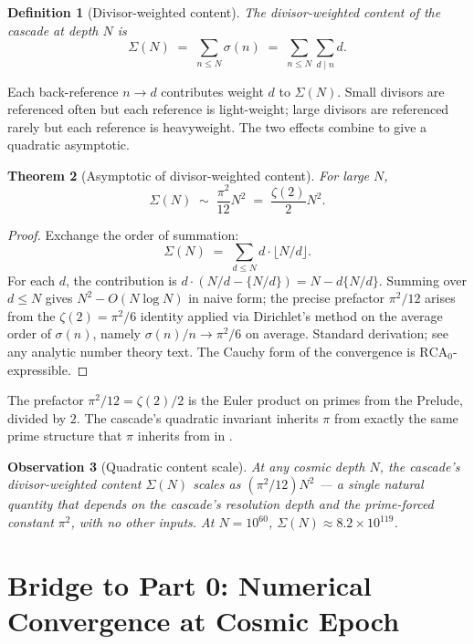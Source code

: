 \documentclass[11pt,a4paper]{article}
\newtheorem{theorem}{Theorem}[section]
\newtheorem{definition}[theorem]{Definition}
\newtheorem{observation}[theorem]{Observation}
\begin{document}
\begin{definition}[Divisor-weighted content]\label{def:divisor-weighted}
The divisor-weighted content of the cascade at depth $N$ is
\[
\Sigma(N) \;=\; \sum_{n \leq N} \sigma(n) \;=\; \sum_{n \leq N} \sum_{d \mid n} d.
\]
\end{definition}

\noindent Each back-reference $n \to d$ contributes weight $d$ to
$\Sigma(N)$. Small divisors are referenced often but each reference
is light-weight; large divisors are referenced rarely but each
reference is heavyweight. The two effects combine to give a
quadratic asymptotic.

\begin{theorem}[Asymptotic of divisor-weighted content]\label{thm:sigma-asymptotic}
For large $N$,
\[
\Sigma(N) \;\sim\; \frac{\pi^2}{12} N^2 \;=\; \frac{\zeta(2)}{2} N^2.
\]
\end{theorem}

\begin{proof}
Exchange the order of summation:
\[
\Sigma(N) \;=\; \sum_{d \leq N} d \cdot \lfloor N/d \rfloor.
\]
For each $d$, the contribution is $d \cdot (N/d - \{N/d\}) =
N - d\{N/d\}$. Summing over $d \leq N$ gives $N^2 - O(N \log N)$ in
naive form; the precise prefactor $\pi^2/12$ arises from the
$\zeta(2) = \pi^2/6$ identity applied via Dirichlet's method on the
average order of $\sigma(n)$, namely $\sigma(n)/n \to \pi^2/6$ on
average. Standard derivation; see any analytic number theory text.
The Cauchy form of the convergence is
$\mathrm{RCA}_0$-expressible.
\end{proof}

\noindent The prefactor $\pi^2/12 = \zeta(2)/2$ is the Euler product
on primes from the Prelude, divided by $2$. The cascade's quadratic
invariant inherits $\pi$ from exactly the same prime structure that
$\pi$ inherits from in .

\begin{observation}[Quadratic content scale]\label{obs:quadratic-scale}
At any cosmic depth $N$, the cascade's divisor-weighted content
$\Sigma(N)$ scales as $(\pi^2/12) N^2$ --- a single natural quantity
that depends on the cascade's resolution depth and the prime-forced
constant $\pi^2$, with no other inputs. At $N = 10^{60}$,
$\Sigma(N) \approx 8.2 \times 10^{119}$.
\end{observation}

\section{Bridge to Part 0: Numerical Convergence at Cosmic Epoch}\label{sec:bridge-part0}
\end{document}
